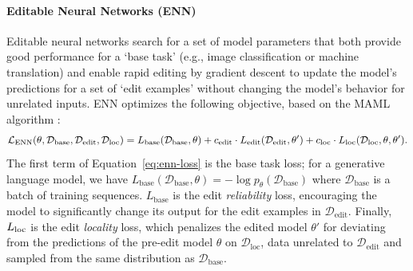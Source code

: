 \documentclass{article}
\begin{document}
\paragraph{Editable Neural Networks (ENN)}
\label{sec:enn-prelims}
Editable neural networks \citep{Sinitsin2020Editable} search for a set of model parameters that both provide good performance for a `base task' (e.g., image classification or machine translation) and enable rapid editing by gradient descent to update the model's predictions for a set of `edit examples' without changing the model's behavior for unrelated inputs. ENN optimizes the following objective, based on the MAML algorithm \citep{finn2017maml}:
\begin{align}
    \mathcal{L}_\text{ENN}(\theta, \mathcal{D}_\text{base}, \mathcal{D}_\text{edit}, \mathcal{D}_\text{loc}) =  L_\text{base}(\mathcal{D}_\text{base}, \theta) + c_\text{edit}\cdot L_\text{edit}(\mathcal{D}_\text{edit}, \theta^\prime) + c_\text{loc}\cdot L_\text{loc}(\mathcal{D}_\text{loc}, \theta, \theta^\prime).\label{eq:enn-loss}
\end{align}
The first term of Equation~\ref{eq:enn-loss} is the base task loss; for a generative language model, we have $ L_\text{base}(\mathcal{D}_\text{base}, \theta) = -\log p_{\theta}(\mathcal{D}_\text{base})$ where $\mathcal{D}_\text{base}$ is a batch of training sequences. $ L_\text{base}$ is the edit \textit{reliability} loss, encouraging the model to significantly change its output for the edit examples in $\mathcal{D}_\text{edit}$. Finally, $L_\text{loc}$ is the edit \textit{locality} loss, which penalizes the edited model $\theta'$ for deviating from the predictions of the pre-edit model $\theta$ on $\mathcal{D}_\text{loc}$, data unrelated to $\mathcal{D}_\text{edit}$ and sampled from the same distribution as $\mathcal{D}_\text{base}$.

\end{document}
